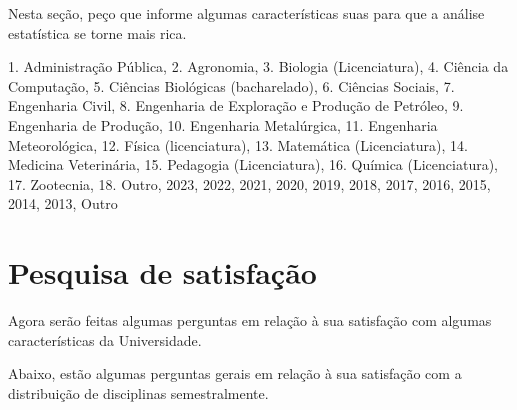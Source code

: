 \begin{apendicesenv}
\begin{Form}[action=mailto:joaovitorfd2000@gmail.com, encoding=html, method=post]
    Nesta seção, peço que informe algumas características suas para que a análise estatística se torne mais rica.

    \begin{enumerate}
      {
        1. Administração Pública,
        2. Agronomia,
        3. Biologia (Licenciatura),
        4. Ciência da Computação,
        5. Ciências Biológicas (bacharelado),
        6. Ciências Sociais,
        7. Engenharia Civil,
        8. Engenharia de Exploração e Produção de Petróleo,
        9. Engenharia de Produção,
        10. Engenharia Metalúrgica,
        11. Engenharia Meteorológica,
        12. Física (licenciatura),
        13. Matemática (Licenciatura),
        14. Medicina Veterinária,
        15. Pedagogia (Licenciatura),
        16. Química (Licenciatura),
        17. Zootecnia,
        18. Outro,
      }
      { 2023, 2022, 2021, 2020, 2019, 2018, 2017, 2016, 2015, 2014, 2013, Outro }
    \end{enumerate}

    \section*{Pesquisa de satisfação}

    Agora serão feitas algumas perguntas em relação à sua satisfação com algumas características da Universidade.

    Abaixo, estão algumas perguntas gerais em relação à sua satisfação com a distribuição de disciplinas semestralmente.

    \begin{enumerate}
    \end{enumerate}


\end{Form}
\end{apendicesenv}
